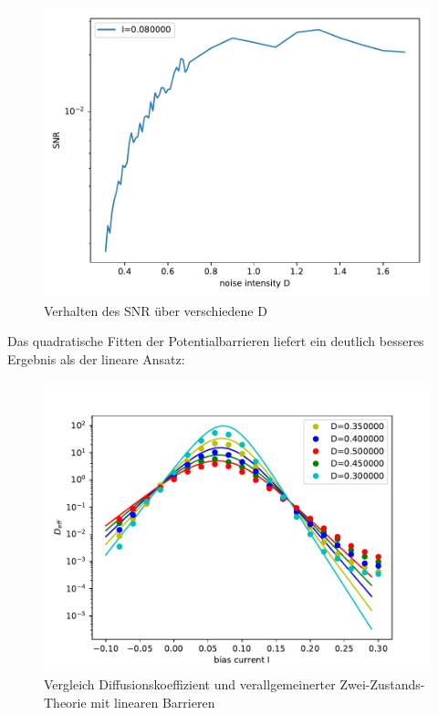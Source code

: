 \documentclass[12pt,a4paper]{article}
\begin{document}
\begin{figure}[H]
	\centering
	\includegraphics[scale=0.9]{snrautoabglongrealdrange6aem2.pdf}
	\caption{Verhalten des SNR über verschiedene D}
	\label{dcomp}
\end{figure}
Das quadratische Fitten der Potentialbarrieren liefert ein deutlich besseres Ergebnis als der lineare Ansatz:
\begin{figure}[H]
	\centering
	\includegraphics[scale=0.9]{dcompdfnewrealfast11jjem2shrealfast19jjem2st.pdf}
	\caption{Vergleich Diffusionskoeffizient und verallgemeinerter Zwei-Zustands-Theorie mit linearen Barrieren}
	\label{dcomplin}
\end{figure}
\end{document}
